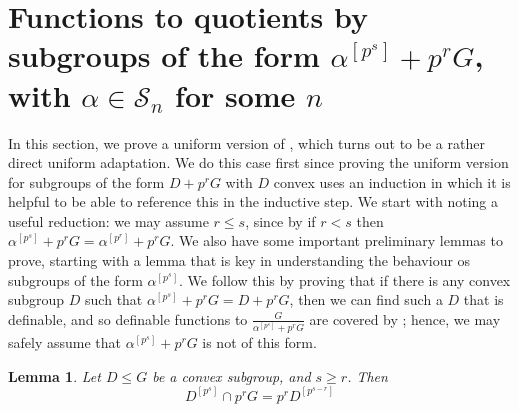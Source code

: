 \documentclass[a4paper,11pt]{article}
\newtheorem{lemma}[theorem]{Lemma}
\newcommand{\nl}{\newline}
\newcommand{\Sn}{\mathcal{S}_n}
\begin{document}
\section{Functions to quotients by subgroups of the form $\alpha^{[p^s]}+p^rG$, with $\alpha\in \Sn$ for some $n$}\label{alpha^{[p^s]}+p^rG section}

In this section, we prove a uniform version of , which turns out to be a rather direct uniform adaptation. We do this case first since proving the uniform version for subgroups of the form $D+p^rG$ with $D$ convex uses an induction in which it is helpful to be able to reference this in the inductive step.
\nl\nl
We start with noting a useful reduction: we may assume $r\leq s$, since by \cite{QE} if $r<s$ then $\alpha^{[p^s]}+p^rG = \alpha^{[p^r]}+p^rG$. We also have some important preliminary lemmas to prove, starting with a lemma that is key in understanding the behaviour os subgroups of the form $\alpha^{[p^s]}$. We follow this by proving that if there is any convex subgroup $D$ such that $\alpha^{[p^s]}+p^rG = D+p^rG$, then we can find such a $D$ that is definable, and so definable functions to $\frac{G}{\alpha^{[p^s]}+p^rG}$ are covered by ; hence, we may safely assume that $\alpha^{[p^s]}+p^rG$ is not of this form.
\begin{lemma}\label{keylemma}
	Let $D\leq G$ be a convex subgroup, and $s\geq r$. Then $$D^{[p^s]}\cap p^rG = p^rD^{[p^{s-r}]}$$
\end{lemma}
\end{document}
